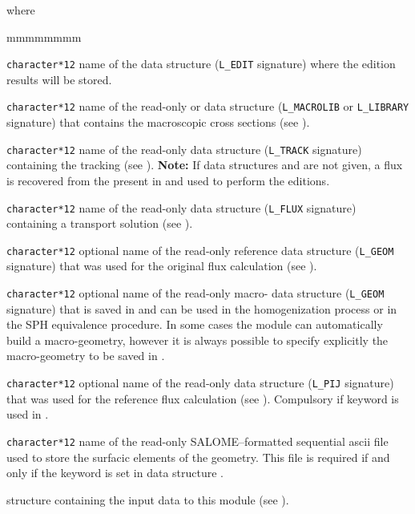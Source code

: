 \noindent
where
\begin{ListeDeDescription}{mmmmmmmm}

\item[\dusa{EDINAM}] {\tt character*12} name of the  data
structure ({\tt L\_EDIT} signature) where the edition results will be stored.

\item[\dusa{LIBNAM}] {\tt character*12} name of the read-only  or
 data structure ({\tt L\_MACROLIB} or {\tt L\_LIBRARY} signature) that contains the
macroscopic cross sections (see ).

\item[\dusa{TRKNAM}] {\tt character*12} name of the read-only  data
structure ({\tt L\_TRACK} signature) containing the tracking (see ). {\bf Note:} If data
structures  and  are not given, a flux is recovered from the 
present in  and used to perform the editions.

\item[\dusa{FLUNAM}] {\tt character*12} name of the read-only  data
structure ({\tt L\_FLUX} signature) containing a transport solution (see ).

\item[\dusa{REFGEO}] {\tt character*12} optional name of the read-only reference  data
structure ({\tt L\_GEOM} signature) that was used for the original flux calculation (see ).

\item[\dusa{MACROGEO}] {\tt character*12} optional name of the read-only macro- data
structure ({\tt L\_GEOM} signature) that is saved in  and can be used in the homogenization
process or in the SPH equivalence procedure. In some cases the
module  can automatically build a macro-geometry, however it is always
possible to specify explicitly the macro-geometry to be saved in .

\item[\dusa{REFPIJ}] {\tt character*12} optional name of the read-only  data
structure ({\tt L\_PIJ} signature) that was used for the reference flux calculation (see ).
Compulsory if keyword  is used in .

\item[\dusa{SURFIL}] \texttt{character*12} name of the read-only SALOME--formatted sequential {\sc ascii}
file used to store the surfacic elements of the geometry. This file is required if and only if the keyword 
is set in data structure .

\item[\dstr{descedi}] structure containing the input data to this module
(see ).

\end{ListeDeDescription}

